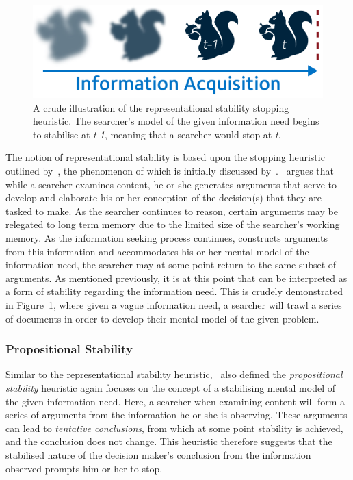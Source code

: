 \begin{figure}
    \begin{center}
    \vspace*{-7mm}
    \includegraphics[width=1\textwidth]{figures/ch3-representational.pdf}
    \end{center}
    \vspace*{-4mm}
    \caption[Representational stability stopping heuristic]{A crude illustration of the representational stability stopping heuristic. The searcher's model of the given information need begins to stabilise at \emph{t-1}, meaning that a searcher would stop at \emph{t}.}
    \label{fig:representational_heuristic}
\end{figure}

The notion of representational stability is based upon the stopping heuristic outlined by~\cite{nickles1995judgment}, the phenomenon of which is initially discussed by~\cite{yates1982toward}.~\cite{nickles1995judgment} argues that while a searcher examines content, he or she generates arguments that serve to develop and elaborate his or her conception of the decision(s) that they are tasked to make. As the searcher continues to reason, certain arguments may be relegated to long term memory due to the limited size of the searcher's working memory. As the information seeking process continues, constructs arguments from this information and accommodates his or her mental model of the information need, the searcher may at some point return to the same subset of arguments. As mentioned previously, it is at this point that can be interpreted as a form of stability regarding the information need. This is crudely demonstrated in Figure~\ref{fig:representational_heuristic}, where given a vague information need, a searcher will trawl a series of documents in order to develop their mental model of the given problem.

\subsubsection{Propositional Stability}
Similar to the representational stability heuristic,~\cite{nickles1995judgment} also defined the \emph{propositional stability} heuristic again focuses on the concept of a stabilising mental model of the given information need. Here, a searcher when examining content will form a series of arguments from the information he or she is observing. These arguments can lead to \emph{tentative conclusions}, from which at some point stability is achieved, and the conclusion does not change. This heuristic therefore suggests that the stabilised nature of the decision maker's conclusion from the information observed prompts him or her to stop.

